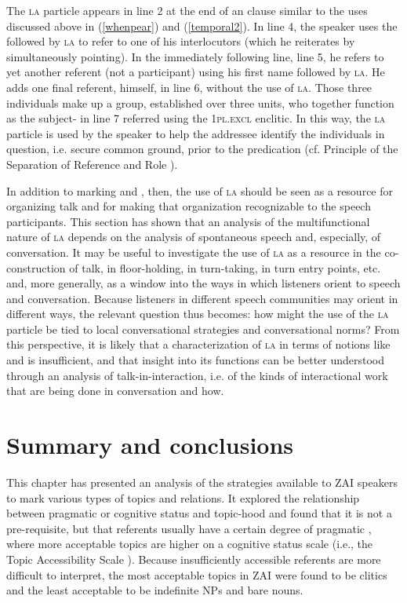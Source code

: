 \z
The \textsc{la} particle appears in line 2 at the end of an  clause similar to the uses discussed above in (\ref{whenpear}) and (\ref{temporal2}). In line 4, the speaker uses the   followed by \textsc{la} to refer to one of his interlocutors (which he reiterates by simultaneously pointing). In the immediately following line, line 5, he refers to yet another  referent (not a participant) using his first name followed by \textsc{la}. He adds one final referent, himself, in line 6, without the use of \textsc{la}. Those three individuals make up a group, established over three  units, who together function as the subject- in line 7 referred using the 1\textsc{pl.excl} enclitic. In this way, the \textsc{la} particle is used by the speaker to help the addressee identify the individuals in question, i.e. secure common ground, prior to the predication (cf. Principle of the Separation of Reference and Role \citep{lambrecht1994}).

In addition to  marking and , then, the use of \textsc{la} should be seen as a resource for organizing talk and for making that organization recognizable to the speech participants. This section has shown that an analysis of the multifunctional nature of \textsc{la} depends on the analysis of spontaneous speech and, especially, of conversation. It may be useful to investigate the use of \textsc{la} as a resource in the co-construction of talk, in floor-holding, in turn-taking, in turn entry points, etc. and, more generally, as a window into the ways in which listeners orient to speech and conversation. Because listeners in different speech communities may orient in different ways, the relevant question thus becomes: how might the use of the \textsc{la} particle be tied to local conversational strategies and conversational norms? From this perspective, it is likely that a characterization of \textsc{la} in terms of notions like  and  is insufficient, and that insight into its functions can be better understood through an analysis of talk-in-interaction, i.e. of the kinds of interactional work that are being done in conversation and how.


\section{Summary and conclusions}

This chapter has presented an analysis of the strategies available to ZAI speakers to mark various types of topics and  relations. It explored the relationship between pragmatic or cognitive status and topic-hood and found that it is not a pre-requisite, but that  referents usually have a certain degree of pragmatic , where more acceptable topics are higher on a cognitive status scale (i.e., the Topic Accessibility Scale \citep{lambrecht1994}). Because insufficiently accessible  referents are more difficult to interpret, the most acceptable topics in ZAI were found to be clitics and the least acceptable to be indefinite NPs and bare nouns.

